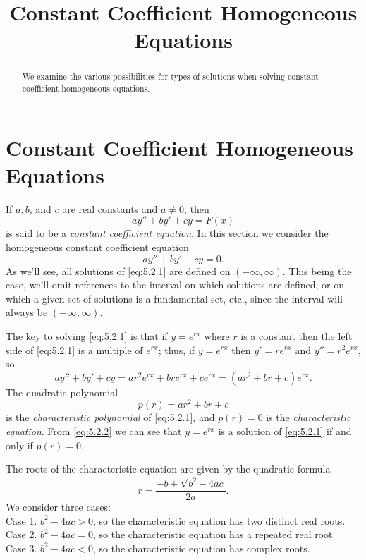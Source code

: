 \documentclass{ximera}
\title{Constant Coefficient Homogeneous Equations}
\begin{document}
\begin{abstract}
We examine the various possibilities for types of solutions when solving constant coefficient homogeneous equations.
\end{abstract}

\maketitle

\section*{Constant Coefficient Homogeneous Equations}

If $a,b$, and $c$ are real constants and $a\neq 0$, then
$$
ay''+by'+cy=F(x)
$$
 is said to be a \textit{constant coefficient
 equation}.
In this section we  consider the homogeneous constant
coefficient equation
\begin{equation} \label{eq:5.2.1}
ay''+by'+cy=0.
\end{equation}
As we'll see, all solutions of \eqref{eq:5.2.1} are defined on
$(-\infty,\infty)$.  This being the case, we'll omit references to the
interval on which solutions are defined, or on which a given set of
solutions is a fundamental set, etc., since the interval will always
be $(-\infty,\infty)$.

The key to solving \eqref{eq:5.2.1} is  that if
 $y=e^{rx}$ where $r$ is a constant  then the left side of
\eqref{eq:5.2.1} is a  multiple of $e^{rx}$;   thus, if $y=e^{rx}$
 then $y'=re^{rx}$ and $y''=r^2e^{rx}$, so
\begin{equation} \label{eq:5.2.2}
ay''+by'+cy=ar^2e^{rx}+bre^{rx}+ce^{rx}=(ar^2+br+c)e^{rx}.
\end{equation}
The quadratic polynomial
$$
p(r)=ar^2+br+c
$$
is  the \textit{characteristic polynomial} of \eqref{eq:5.2.1}, and
$p(r)=0$
is the \textit{characteristic equation}.
From \eqref{eq:5.2.2} we can see that $y=e^{rx}$ is a solution of
\eqref{eq:5.2.1}  if and only if $p(r)=0$.

The roots of the characteristic equation are given by the quadratic
formula
\begin{equation} \label{eq:5.2.3}
r=\frac{-b\pm\sqrt{b^2-4ac}}{2a}.
\end{equation}
We consider three cases:\\
Case 1. $b^2-4ac>0$, so the characteristic equation has two
distinct real roots.\\
Case 2. $b^2-4ac=0$, so the characteristic equation has a
repeated real root.\\
Case 3. $b^2-4ac<0$, so the characteristic equation has
complex roots.
\end{document}
